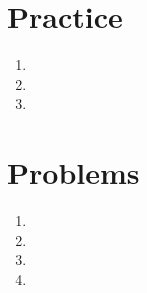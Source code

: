 \documentclass{article}
\title{\titleme}
\author{\authorme}
\begin{document}
\maketitle

\section*{Practice}
\begin{enumerate}
    \item 
    \item 
    \item 
\end{enumerate}

\section*{Problems}
\begin{enumerate}
    \item 
    \item 
    \item 
    \item 
\end{enumerate}
\end{document}
